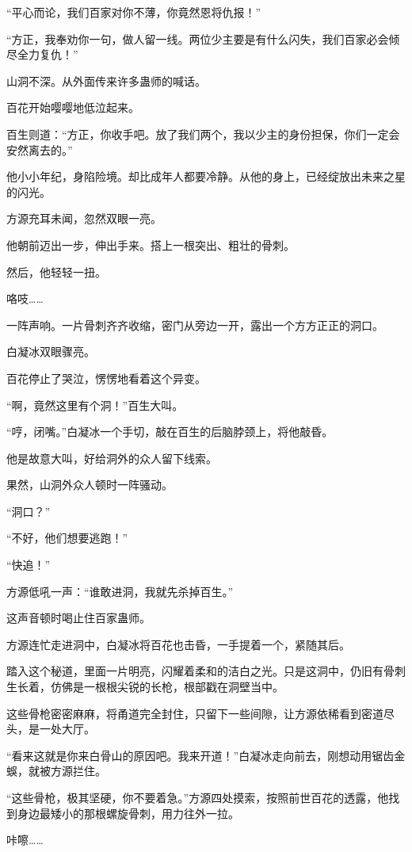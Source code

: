 \begin{this_body}
“平心而论，我们百家对你不薄，你竟然恩将仇报！”

“方正，我奉劝你一句，做人留一线。两位少主要是有什么闪失，我们百家必会倾尽全力复仇！”

山洞不深。从外面传来许多蛊师的喊话。

百花开始嘤嘤地低泣起来。

百生则道：“方正，你收手吧。放了我们两个，我以少主的身份担保，你们一定会安然离去的。”

他小小年纪，身陷险境。却比成年人都要冷静。从他的身上，已经绽放出未来之星的闪光。

方源充耳未闻，忽然双眼一亮。

他朝前迈出一步，伸出手来。搭上一根突出、粗壮的骨刺。

然后，他轻轻一扭。

咯吱……

一阵声响。一片骨刺齐齐收缩，密门从旁边一开，露出一个方方正正的洞口。

白凝冰双眼骤亮。

百花停止了哭泣，愣愣地看着这个异变。

“啊，竟然这里有个洞！”百生大叫。

“哼，闭嘴。”白凝冰一个手切，敲在百生的后脑脖颈上，将他敲昏。

他是故意大叫，好给洞外的众人留下线索。

果然，山洞外众人顿时一阵骚动。

“洞口？”

“不好，他们想要逃跑！”

“快追！”

方源低吼一声：“谁敢进洞，我就先杀掉百生。”

这声音顿时喝止住百家蛊师。

方源连忙走进洞中，白凝冰将百花也击昏，一手提着一个，紧随其后。

踏入这个秘道，里面一片明亮，闪耀着柔和的洁白之光。只是这洞中，仍旧有骨刺生长着，仿佛是一根根尖锐的长枪，根部戳在洞壁当中。

这些骨枪密密麻麻，将甬道完全封住，只留下一些间隙，让方源依稀看到密道尽头，是一处大厅。

“看来这就是你来白骨山的原因吧。我来开道！”白凝冰走向前去，刚想动用锯齿金蜈，就被方源拦住。

“这些骨枪，极其坚硬，你不要着急。”方源四处摸索，按照前世百花的透露，他找到身边最矮小的那根螺旋骨刺，用力往外一拉。

咔嚓……


\end{this_body}
